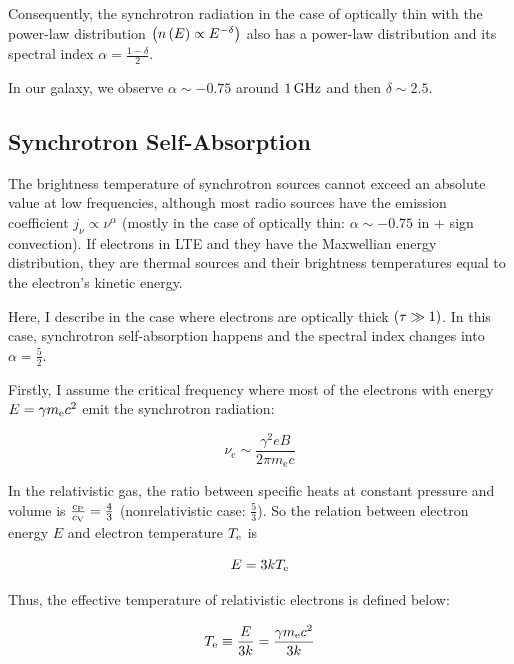 Consequently, the synchrotron radiation in the case of optically thin with the power-law distribution $\left(n\left(E\right) \propto E^{-\delta}\right)$ also has a power-law distribution and its spectral index $\alpha = \frac{1-\delta}{2}$.

In our galaxy, we observe $\alpha\sim-0.75$ around $1\,\mathrm{GHz}$ and then $\delta \sim 2.5$.



\subsection{Synchrotron Self-Absorption}\label{synchrotronselfabsorption}

The brightness temperature of synchrotron sources cannot exceed an absolute value at low frequencies, although most radio sources have the emission coefficient $j_{\nu} \propto \nu^{\alpha}$ (mostly in the case of optically thin: $\alpha\sim-0.75$ in $+$ sign convection).
If electrons in LTE and they have the Maxwellian energy distribution, they are thermal sources and their brightness temperatures equal to the electron's kinetic energy.

Here, I describe in the case where electrons are optically thick $\left(\tau \gg 1\right)$.
In this case, synchrotron self-absorption happens and the spectral index changes into $\alpha = \frac{5}{2}$.

Firstly, I assume the critical frequency where most of the electrons with energy $E = \gamma m_{\mathrm{e}} c^2$ emit the synchrotron radiation:

\begin{equation}\label{eq:essential_radio5n80}
    \nu_{\mathrm{c}} \sim \frac{\gamma^{2} e B}{2 \pi m_{\mathrm{e}} c}
\end{equation}

In the relativistic gas, the ratio between specific heats at constant pressure and volume is $\frac{c_{\mathrm{P}}}{c_{\mathrm{V}}}=\frac{4}{3}$ (nonrelativistic case: $\frac{5}{3}$).
So the relation between electron energy $E$ and electron temperature $T_{\mathrm{e}}$ is

\begin{equation}\label{eq:essential_radio5n82}
    E=3 k T_{\mathrm{e}}
\end{equation}

Thus, the effective temperature of relativistic electrons is defined below:

\begin{equation}\label{eq:essential_radio5n83}
    T_{\mathrm{e}} \equiv \frac{E}{3 k}=\frac{\gamma m_{\mathrm{e}} c^2}{3 k}
\end{equation}

